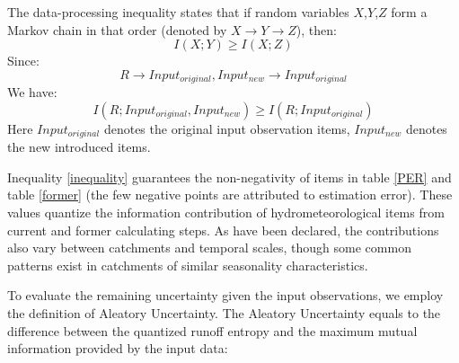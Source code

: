 \documentclass[11pt]{article}
\begin{document}
The data-processing inequality states that if random variables $X$,$Y$,$Z$ form a Markov chain in that order (denoted by $X \rightarrow Y \rightarrow Z$), then:
\begin{equation}
I(X;Y) \geq I(X;Z)
\end{equation}
Since:
\begin{equation}
R \rightarrow Input_{original},Input_{new} \rightarrow Input_{original}
\end{equation} 
We have:
\begin{equation}
\label{inequality}
I(R;Input_{original},Input_{new}) \geq I(R;Input_{original})
\end{equation}
Here $Input_{original}$ denotes the original input observation items, $Input_{new}$ denotes the new introduced items.  

Inequality \ref{inequality} guarantees the non-negativity of items in table \ref{PER} and table \ref{former} (the few negative points are attributed to estimation error).  
These values quantize the information contribution of  hydrometeorological items from current and former calculating steps. As have been declared, the contributions also vary between catchments and temporal scales, though some common patterns exist in catchments of similar seasonality characteristics.



To evaluate the remaining uncertainty given the input observations, we employ the definition of Aleatory Uncertainty. The Aleatory Uncertainty equals to the difference between the quantized runoff entropy and the maximum mutual information provided by the input data:
\end{document}
